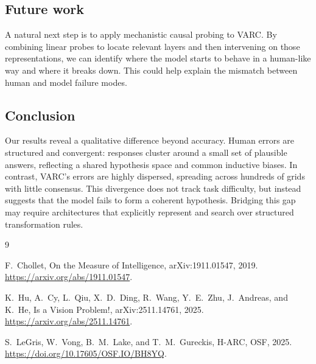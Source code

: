 \documentclass[10pt,letterpaper]{article}
\begin{document}
\subsection{Future work}

A natural next step is to apply mechanistic causal probing to VARC.
By combining linear probes to locate relevant layers and then
intervening on those representations, we can identify where the model
starts to behave in a human-like way and where it breaks down.
This could help explain the mismatch between human and model failure
modes.

\subsection{Conclusion}

Our results reveal a qualitative difference beyond accuracy. Human
errors are structured and convergent: responses cluster around a small
set of plausible answers, reflecting a shared hypothesis space and
common inductive biases. In contrast, VARC's errors are highly
dispersed, spreading across hundreds of grids with little consensus.
This divergence does not track task difficulty, but instead suggests
that the model fails to form a coherent hypothesis. Bridging this gap
may require architectures that explicitly represent and search over
structured transformation rules.

\begin{thebibliography}{9}

F.~Chollet,
\newblock On the Measure of Intelligence,
\newblock arXiv:1911.01547, 2019.
\newblock \url{https://arxiv.org/abs/1911.01547}.

K.~Hu, A.~Cy, L.~Qiu, X.~D.~Ding, R.~Wang, Y.~E.~Zhu, J.~Andreas, and K.~He,
 Is a Vision Problem!,
\newblock arXiv:2511.14761, 2025.
\newblock \url{https://arxiv.org/abs/2511.14761}.

S.~LeGris, W.~Vong, B.~M.~Lake, and T.~M.~Gureckis,
\newblock H-ARC,
\newblock OSF, 2025.
\newblock \url{https://doi.org/10.17605/OSF.IO/BH8YQ}.

\end{thebibliography}
\end{document}
